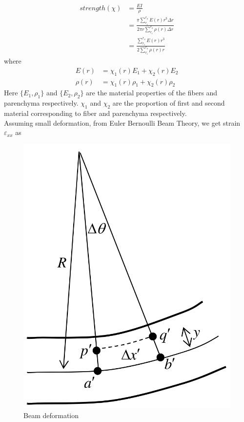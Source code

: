 \documentclass[openright,twoside]{iitkthesis}
\begin{document}
\begin{equation}\label{objective_eb}
\begin{split}
strength(\chi) &=\frac{EI}{\rho}\\
&=\frac{\pi\sum^{r_o}_{r_i}E(r)r^3\Delta r}{2\pi r\sum^{r_o}_{r_i}\rho(r)\Delta r}\\
&=\frac{\sum^{r_o}_{r_i}E(r)r^3}{2 \sum^{r_o}_{r_i}\rho(r)r}
\end{split}
\end{equation}
where 
\begin{equation}
\begin{split}
E(r) &= \chi_1(r) E_1 + \chi_2(r) E_2\\
\rho(r) &= \chi_1(r) \rho_1 + \chi_2(r) \rho_2
\end{split}
\end{equation}
Here $\{E_1, \rho_1\}$ and $\{E_2, \rho_2\}$ are the material properties of the fibers and parenchyma respectively. $\chi_1$ and $\chi_2$ are the proportion of first and second material corresponding to fiber and parenchyma respectively.\\
Assuming small deformation, from Euler Bernoulli Beam Theory, we get strain $\varepsilon_{xx}$ as\\
\begin{figure}
\begin{center}
\includegraphics[scale=0.15]{./Plots/normal/eb.png}
\caption{Beam deformation}
\end{center}
\end{figure}
\end{document}
